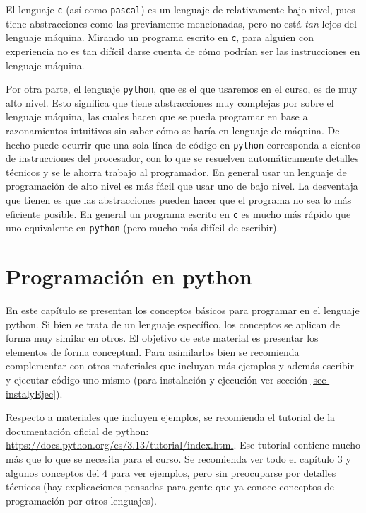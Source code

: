 \documentclass[a4paper, 12pt]{report}
\theoremstyle{definition}
\begin{document}
El lenguaje {\tt c} (así como {\tt pascal}) es un lenguaje de relativamente bajo nivel, pues tiene abstracciones como las previamente mencionadas, pero no está {\sl tan} lejos del lenguaje máquina. Mirando un programa escrito en {\tt c}, para alguien con experiencia no es tan difícil darse cuenta de cómo podrían ser las instrucciones en lenguaje máquina.

Por otra parte, el lenguaje {\tt python}, que es el que usaremos en el curso, es de muy alto nivel. Esto significa que tiene abstracciones muy complejas por sobre el lenguaje máquina, las cuales hacen que se pueda programar en base a razonamientos intuitivos sin saber cómo se haría en lenguaje de máquina. De hecho puede ocurrir que una sola línea de código en {\tt python} corresponda a cientos de instrucciones del procesador, con lo que se resuelven automáticamente detalles técnicos y se le ahorra trabajo al programador. En general usar un lenguaje de programación de alto nivel es más fácil que usar uno de bajo nivel. La desventaja que tienen es que las abstracciones pueden hacer que el programa no sea lo más eficiente posible. En general un programa escrito en {\tt c} es mucho más rápido que uno equivalente en {\tt python} (pero mucho más difícil de escribir).

\chapter{Programación en python}

En este capítulo se presentan los conceptos básicos para programar en el lenguaje python. Si bien se trata de un lenguaje específico, los conceptos se aplican de forma muy similar en otros. El objetivo de este material es presentar los elementos de forma conceptual. Para asimilarlos bien se recomienda complementar con otros materiales que incluyan más ejemplos y además escribir y ejecutar código uno mismo (para instalación y ejecución ver sección \ref{sec-instalyEjec}).

Respecto a materiales que incluyen ejemplos, se recomienda el tutorial de la documentación oficial de python: \href{https://docs.python.org/es/3.13/tutorial/index.html}{https://docs.python.org/es/3.13/tutorial/index.html}. Ese tutorial contiene mucho más que lo que se necesita para el curso. Se recomienda ver todo el capítulo 3 y algunos conceptos del 4 para ver ejemplos, pero sin preocuparse por detalles técnicos (hay explicaciones pensadas para gente que ya conoce conceptos de programación por otros lenguajes).
\end{document}
